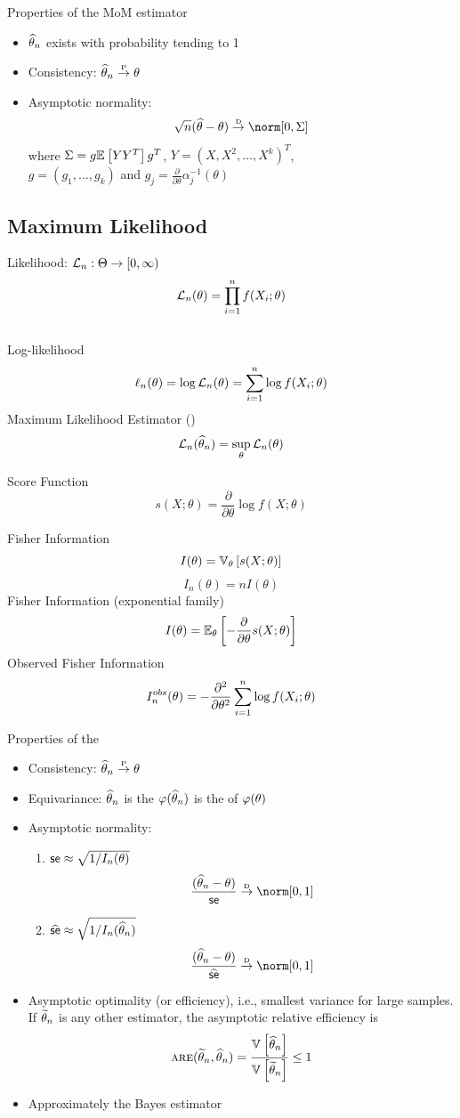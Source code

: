 \documentclass[landscape]{article}
\begin{document}
\begin{multicols*}{2}
Properties of the MoM estimator
\begin{itemize}
  \item $\that_n$ exists with probability tending to 1
  \item Consistency: $\that_n \pconv \theta$
  \item Asymptotic normality:
    $$\sqrt{n}(\that-\theta) \dconv \norm[0,\Sigma]$$
    where $\Sigma = g\E{YY^T}g^T$, $Y = (X,X^2,\dots,X^k)^T$,\\
    $g = (g_1,\dots,g_k)$ and 
    $g_j = \frac{\partial}{\partial\theta}\alpha_j^{-1}(\theta)$
\end{itemize}

\subsection{Maximum Likelihood}

Likelihood: $\Lln : \Theta \to [0,\infty)$
  $$\Lln(\theta) = \displaystyle\prodin f(X_i;\theta)$$ \\
Log-likelihood 
  $$\lln(\theta) = \log \Lln(\theta) = \sumin \log f(X_i;\theta)$$
Maximum Likelihood Estimator (\mle) 
$$\Lln(\that_n) = \sup_\theta \Lln(\theta)$$

Score Function
$$s(X;\theta) = \frac{\partial}{\partial\theta}\log f(X;\theta)$$

Fisher Information
$$I(\theta) = \V[\theta]{s(X;\theta)}$$
$$I_n(\theta) = nI(\theta)$$
Fisher Information (exponential family)
$$I(\theta) = \E[\theta]{-\frac{\partial}{\partial\theta} s(X;\theta)}$$
Observed Fisher Information
$$I_n^{obs}(\theta) 
  = -\frac{\partial^2}{\partial\theta^2} \sumin\log f(X_i;\theta)$$

Properties of the \mle
\begin{itemize}
  \item Consistency: $\that_n \pconv \theta$
  \item Equivariance: 
    $\that_n$ is the \mle \imp $\transform(\that_n)$ is
    the \mle of $\transform(\theta)$
  \item Asymptotic normality:
    \begin{enumerate}
      \item $\se \approx \sqrt{1/I_n(\theta)}$
        $$\frac{(\that_n - \theta)}{\se} \dconv \norm[0,1]$$
      \item $\sehat \approx \sqrt{1/I_n(\that_n)}$
        $$\frac{(\that_n - \theta)}{\sehat} \dconv \norm[0,1]$$
    \end{enumerate}
  \item Asymptotic optimality (or efficiency), i.e., smallest variance for
    large samples.  If $\ttil_n$ is any other estimator, the asymptotic
    relative efficiency is
    $$\are(\ttil_n, \that_n) 
      = \frac{\V{\that_n}}{\V{\ttil_n}}
      \le 1$$
  \item Approximately the Bayes estimator
\end{itemize}


\end{multicols*}
\end{document}
